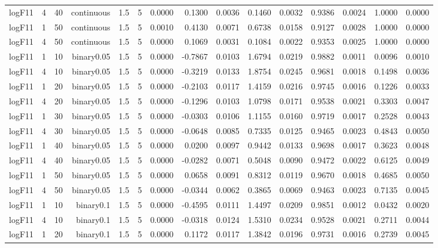 \begin{longtable}{rrrrrrrrrrrrrrr}
  logF11 & 4 & 40 & continuous & 1.5 & 5 & 0.0000 & 0.1300 & 0.0036 & 0.1460 & 0.0032 & 0.9386 & 0.0024 & 1.0000 & 0.0000 \\ 
  logF11 & 1 & 50 & continuous & 1.5 & 5 & 0.0010 & 0.4130 & 0.0071 & 0.6738 & 0.0158 & 0.9127 & 0.0028 & 1.0000 & 0.0000 \\ 
  logF11 & 4 & 50 & continuous & 1.5 & 5 & 0.0000 & 0.1069 & 0.0031 & 0.1084 & 0.0022 & 0.9353 & 0.0025 & 1.0000 & 0.0000 \\ 
  logF11 & 1 & 10 & binary0.05 & 1.5 & 5 & 0.0000 & -0.7867 & 0.0103 & 1.6794 & 0.0219 & 0.9882 & 0.0011 & 0.0096 & 0.0010 \\ 
  logF11 & 4 & 10 & binary0.05 & 1.5 & 5 & 0.0000 & -0.3219 & 0.0133 & 1.8754 & 0.0245 & 0.9681 & 0.0018 & 0.1498 & 0.0036 \\ 
  logF11 & 1 & 20 & binary0.05 & 1.5 & 5 & 0.0000 & -0.2103 & 0.0117 & 1.4159 & 0.0216 & 0.9745 & 0.0016 & 0.1226 & 0.0033 \\ 
  logF11 & 4 & 20 & binary0.05 & 1.5 & 5 & 0.0000 & -0.1296 & 0.0103 & 1.0798 & 0.0171 & 0.9538 & 0.0021 & 0.3303 & 0.0047 \\ 
  logF11 & 1 & 30 & binary0.05 & 1.5 & 5 & 0.0000 & -0.0303 & 0.0106 & 1.1155 & 0.0160 & 0.9719 & 0.0017 & 0.2528 & 0.0043 \\ 
  logF11 & 4 & 30 & binary0.05 & 1.5 & 5 & 0.0000 & -0.0648 & 0.0085 & 0.7335 & 0.0125 & 0.9465 & 0.0023 & 0.4843 & 0.0050 \\ 
  logF11 & 1 & 40 & binary0.05 & 1.5 & 5 & 0.0000 & 0.0200 & 0.0097 & 0.9442 & 0.0133 & 0.9698 & 0.0017 & 0.3623 & 0.0048 \\ 
  logF11 & 4 & 40 & binary0.05 & 1.5 & 5 & 0.0000 & -0.0282 & 0.0071 & 0.5048 & 0.0090 & 0.9472 & 0.0022 & 0.6125 & 0.0049 \\ 
  logF11 & 1 & 50 & binary0.05 & 1.5 & 5 & 0.0000 & 0.0658 & 0.0091 & 0.8312 & 0.0119 & 0.9670 & 0.0018 & 0.4685 & 0.0050 \\ 
  logF11 & 4 & 50 & binary0.05 & 1.5 & 5 & 0.0000 & -0.0344 & 0.0062 & 0.3865 & 0.0069 & 0.9463 & 0.0023 & 0.7135 & 0.0045 \\ 
  logF11 & 1 & 10 & binary0.1 & 1.5 & 5 & 0.0000 & -0.4595 & 0.0111 & 1.4497 & 0.0209 & 0.9851 & 0.0012 & 0.0432 & 0.0020 \\ 
  logF11 & 4 & 10 & binary0.1 & 1.5 & 5 & 0.0000 & -0.0318 & 0.0124 & 1.5310 & 0.0234 & 0.9528 & 0.0021 & 0.2711 & 0.0044 \\ 
  logF11 & 1 & 20 & binary0.1 & 1.5 & 5 & 0.0000 & 0.1172 & 0.0117 & 1.3842 & 0.0196 & 0.9731 & 0.0016 & 0.2739 & 0.0045 \\ 

\end{longtable}
